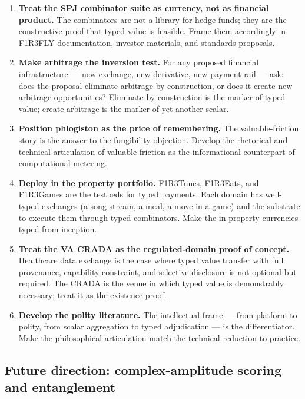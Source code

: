 \documentclass[11pt]{article}
\begin{document}
\begin{enumerate}[leftmargin=*]
\item \textbf{Treat the SPJ combinator suite as currency, not as financial product.} The combinators are not a library for hedge funds; they are the constructive proof that typed value is feasible. Frame them accordingly in F1R3FLY documentation, investor materials, and standards proposals.

\item \textbf{Make arbitrage the inversion test.} For any proposed financial infrastructure --- new exchange, new derivative, new payment rail --- ask: does the proposal eliminate arbitrage by construction, or does it create new arbitrage opportunities? Eliminate-by-construction is the marker of typed value; create-arbitrage is the marker of yet another scalar.

\item \textbf{Position phlogiston as the price of remembering.} The valuable-friction story is the answer to the fungibility objection. Develop the rhetorical and technical articulation of valuable friction as the informational counterpart of computational metering.

\item \textbf{Deploy in the property portfolio.} F1R3Tunes, F1R3Eats, and F1R3Games are the testbeds for typed payments. Each domain has well-typed exchanges (a song stream, a meal, a move in a game) and the substrate to execute them through typed combinators. Make the in-property currencies typed from inception.

\item \textbf{Treat the VA CRADA as the regulated-domain proof of concept.} Healthcare data exchange is the case where typed value transfer with full provenance, capability constraint, and selective-disclosure is not optional but required. The CRADA is the venue in which typed value is demonstrably necessary; treat it as the existence proof.

\item \textbf{Develop the polity literature.} The intellectual frame --- from platform to polity, from scalar aggregation to typed adjudication --- is the differentiator. Make the philosophical articulation match the technical reduction-to-practice.
\end{enumerate}

\subsection{Future direction: complex-amplitude scoring and entanglement}\label{sec:quantum}
\end{document}
